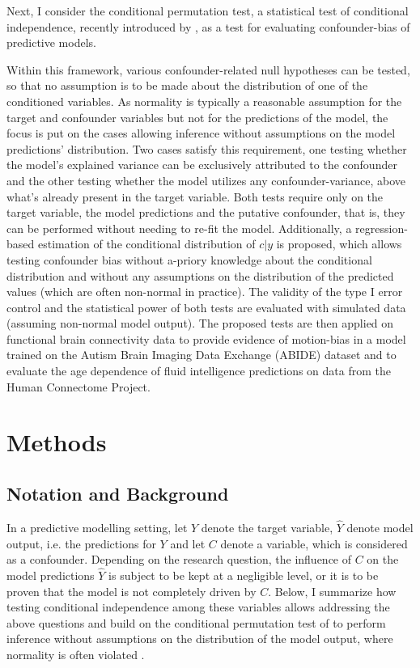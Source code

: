 \documentclass{article}
\begin{document}
Next, I consider the conditional permutation test, a statistical test of conditional independence, recently introduced by \cite{berrett2020conditional}, as a test for evaluating confounder-bias of predictive models.

Within this framework, various confounder-related null hypotheses can be tested, so that no assumption is to be made about the distribution of one of the conditioned variables. As normality is typically a reasonable assumption for the target and confounder variables but not for the predictions of the model, the focus is put on the cases allowing inference without assumptions on the model predictions' distribution.
Two cases satisfy this requirement, one testing whether the model's explained variance can be exclusively attributed to the confounder and the other testing whether the model utilizes any confounder-variance, above what's already present in the target variable.
Both tests require only on the target variable, the model predictions and the putative confounder, that is, they can be performed without needing to re-fit the model.
Additionally, a regression-based estimation of the conditional distribution of $c|y$ is proposed, which allows testing confounder bias without a-priory knowledge about the conditional distribution and without any assumptions on the distribution of the predicted values (which are often non-normal in practice).
The validity of the type I error control and the statistical power of both tests are evaluated with simulated data (assuming non-normal model output).
The proposed tests are then applied on functional brain connectivity data to provide evidence of motion-bias in a model trained on the Autism Brain Imaging Data Exchange (ABIDE) dataset \citep{di2014autism} and to evaluate the age dependence of fluid intelligence predictions on data from the Human Connectome Project.

\section{Methods}

\subsection{Notation and Background}

In a predictive modelling setting, let $Y$ denote the target variable, $\hat{Y}$ denote model output, i.e. the predictions for $Y$ and let $C$ denote a variable, which is considered as a confounder. Depending on the research question, the influence of $C$ on the model predictions $\hat{Y}$ is subject to be kept at a negligible level, or it is to be proven that the model is not completely driven by $C$. Below, I summarize how testing conditional independence \citep{dawid1979conditional} among these variables allows addressing the above questions and build on the conditional permutation test of \cite{berrett2020conditional} to perform inference without assumptions on the distribution of the model output, where normality is often violated \citep{garcia2009study, kristensen2017whole}.
\end{document}
